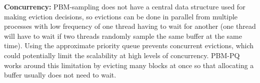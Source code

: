 \textbf{Concurrency:} PBM-sampling does not have a central data structure used for making eviction decisions, so evictions can be done in parallel from multiple processes with low frequency of one thread having to wait for another (one thread will have to wait if two threads randomly sample the same buffer at the same time). Using the approximate priority queue prevents concurrent evictions, which could potentially limit the scalability at high levels of concurrency. PBM-PQ works around this limitation by evicting many blocks at once so that allocating a buffer usually does not need to wait.%



